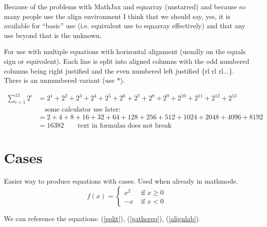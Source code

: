 \documentclass[12pt,a4paper,onecolumn]{article}
\begin{document}
Because of the problems with MathJax and eqnarray (unstarred) and because so many people use the align environment I think that we should say, yes, it is available for ``basic'' use (i.e. equivalent use to eqnarray effectively) and that any use beyond that is the unknown. 

For use with multiple equations with horizontal alignment (usually on the equals sign or equivalent). Each line is split into aligned columns with the odd numbered columns being right justified and the even numbered left justified \{rl rl rl...\}. There is an unnumbered variant (use *). 

\begin{align}
\label{alignlab} \sum_{i=1}^{13} 2^i &= 2^1 + 2^2 + 2^3 + 2^4 + 2^5 + 2^6 + 2^7 + 2^8 + 2^9 + 2^{10} + 2^{11} + 2^{12} + 2^{13}\\%
&\quad \text{some calculator use later:}\nonumber\\
&=2 + 4 + 8 + 16 + 32 + 64 + 128 + 256 + 512 + 1024 + 2048 + 4096 + 8192 \nonumber\\%
&=16382 \qquad\text{text in formulas does not break} %
\end{align}


\section[Cases]{Cases}

Easier way to produce equations with cases. Used when already in mathmode. 
\begin{equation*}
f(x) = \begin{cases} x^2 & \text{ if } x\geq0\\
-x & \text{ if } x<0 \end{cases}
\end{equation*}

We can reference the equations: (\ref{split}), (\ref{gathereq}), (\ref{alignlab}). 
\end{document}
